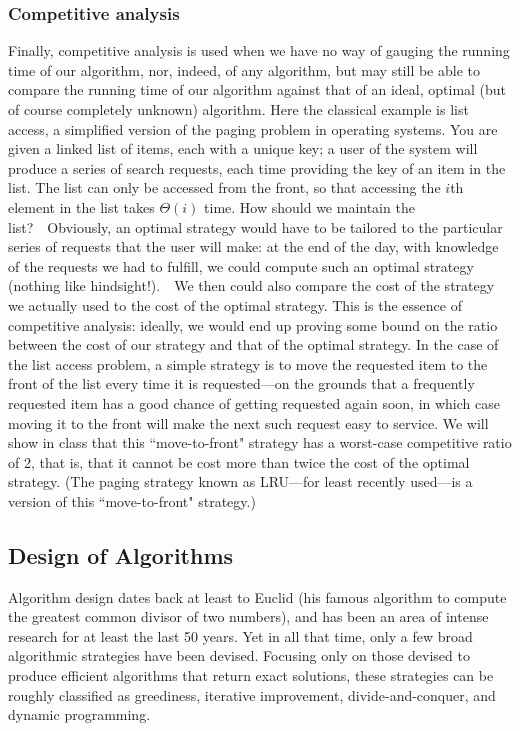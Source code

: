 \documentclass{article}
\begin{document}
\subsubsection{Competitive analysis}
Finally, competitive analysis is used when we have no way of gauging
the running time of our algorithm, nor, indeed, of any algorithm, but
may still be able to compare the running time of our algorithm against
that of an ideal, optimal (but of course completely unknown) algorithm.
Here the classical example is list access, a simplified version of
the paging problem in operating systems.   You are given a linked list
of items, each with a unique key; a user of the system will produce a series
of search requests, each time providing the key of an item in the list.
The list can only be accessed from the front, so that accessing the $i$th
element in the list takes $\Theta(i)$ time.
How should we maintain the list?\ \ Obviously, an optimal strategy would have
to be tailored to the particular series of requests that the user will make:
at the end of the day, with knowledge of the requests we had to fulfill,
we could compute such an optimal strategy (nothing like hindsight!).\ \ 
We then could also compare the cost of the strategy we actually used to the
cost of the optimal strategy.  This is the essence of competitive analysis:
ideally, we would end up proving some bound on the ratio between the cost
of our strategy and that of the optimal strategy.  In the case of the list
access problem, a simple strategy is to move the requested item to the front
of the list every time it is requested---on the grounds that a frequently
requested item has a good chance of getting requested again soon, in which
case moving it to the front will make the next such request easy to service.
We will show in class that this ``move-to-front" strategy has a worst-case
competitive ratio of 2, that is, that it cannot be cost more than twice
the cost of the optimal strategy.  (The paging strategy known as LRU---for
least recently used---is a version of this ``move-to-front" strategy.)

\subsection{Design of Algorithms}
Algorithm design dates back at least to Euclid (his famous algorithm
to compute the greatest common divisor of two numbers), and has been
an area of intense research for at least the last 50 years.  Yet in
all that time, only a few broad algorithmic strategies have been devised.
Focusing only on those devised to produce efficient algorithms that return
exact solutions, these strategies can be roughly classified as
greediness, iterative improvement, divide-and-conquer, and dynamic programming.
\end{document}
